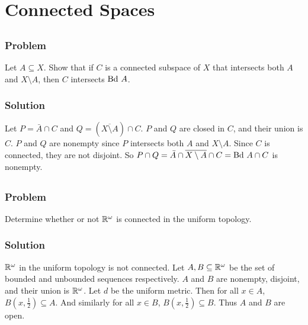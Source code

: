 \setcounter{section}{22} %
\section{Connected Spaces}
\label{sec-connected}
 

\setcounter{subsection}{5} %
\subsection{}

\subsubsection{Problem}
Let $A \subseteq X$. Show that if $C$ is a connected subspace of $X$ that intersects both $A$ and $X \setminus A$, then $C$ intersects $\mathrm{Bd\ } A$.

\subsubsection{Solution}
Let $P = \bar A \cap C$ and $Q = (\overline{X \setminus A}) \cap C$. $P$ and $Q$ are closed in $C$, and their union is $C$. $P$ and $Q$ are nonempty since $P$ intersects both $A$ and $X \setminus A$. Since $C$ is connected, they are not disjoint. So $P \cap Q = \bar A \cap \overline{X \setminus A} \cap C = \mathrm{Bd\ } A \cap C$ is nonempty.


\setcounter{subsection}{7} %
\subsection{}

\subsubsection{Problem}
Determine whether or not $\mathbb R^\omega$ is connected in the uniform topology.

\subsubsection{Solution}
$\mathbb R^\omega$ in the uniform topology is not connected. Let $A, B \subseteq \mathbb R^\omega$ be the set of bounded and unbounded sequences respectively. $A$ and $B$ are nonempty, disjoint, and their union is $\mathbb R^\omega$. Let $d$ be the uniform metric. Then for all $x \in A$, $B(x, \frac12) \subseteq A$. And similarly for all $x \in B$, $B(x, \frac12) \subseteq B$. Thus $A$ and $B$ are open.


